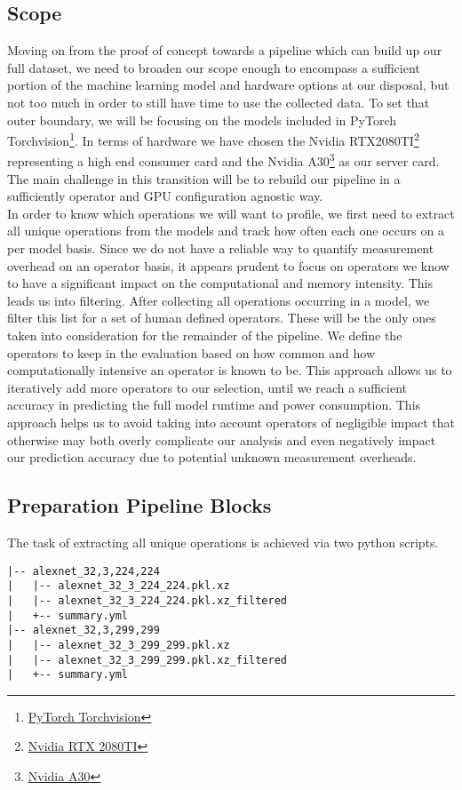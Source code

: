 \documentclass[conference]{IEEEtran}
\begin{document}
\subsection{Scope}
Moving on from the proof of concept towards a pipeline which can build up our full dataset, we need to broaden our scope enough to encompass a sufficient portion of the machine learning model and hardware options at our disposal, but not too much in order to still have time to use the collected data.
To set that outer boundary, we will be focusing on the models included in PyTorch Torchvision\footnote{\href{https://pytorch.org/vision/stable/index.html}{PyTorch Torchvision}}. In terms of hardware we have chosen the Nvidia RTX2080TI\footnote{\href{https://www.techpowerup.com/gpu-specs/geforce-rtx-2080-ti.c3305}{Nvidia RTX 2080TI}} representing a high end consumer card and the Nvidia A30\footnote{\href{https://www.techpowerup.com/gpu-specs/a30-pcie.c3792}{Nvidia A30}} as our server card. The main challenge in this transition will be to rebuild our pipeline in a sufficiently operator and GPU configuration agnostic way. \\
In order to know which operations we will want to profile, we first need to extract all unique operations from the models and track how often each one occurs on a per model basis. Since we do not have a reliable way to quantify measurement overhead on an operator basis, it appears prudent to focus on operators we know to have a significant impact on the computational and memory intensity. This leads us into filtering. After collecting all operations occurring in a model, we filter this list for a set of human defined operators. These will be the only ones taken into consideration for the remainder of the pipeline. We define the operators to keep in the evaluation based on how common and how computationally intensive an operator is known to be. This approach allows us to iteratively add more operators to our selection, until we reach a sufficient accuracy in predicting the full model runtime and power consumption. This approach helps us to avoid taking into account operators of negligible impact that otherwise may both overly complicate our analysis and even negatively impact our prediction accuracy due to potential unknown measurement overheads. 

\subsection{Preparation Pipeline Blocks}
The task of extracting all unique operations is achieved via two python scripts. \\
\begin{Verbatim}[fontsize=\small]
|-- alexnet_32,3,224,224
|   |-- alexnet_32_3_224_224.pkl.xz
|   |-- alexnet_32_3_224_224.pkl.xz_filtered
|   +-- summary.yml
|-- alexnet_32,3,299,299
|   |-- alexnet_32_3_299_299.pkl.xz
|   |-- alexnet_32_3_299_299.pkl.xz_filtered
|   +-- summary.yml
\end{Verbatim}
\end{document}
